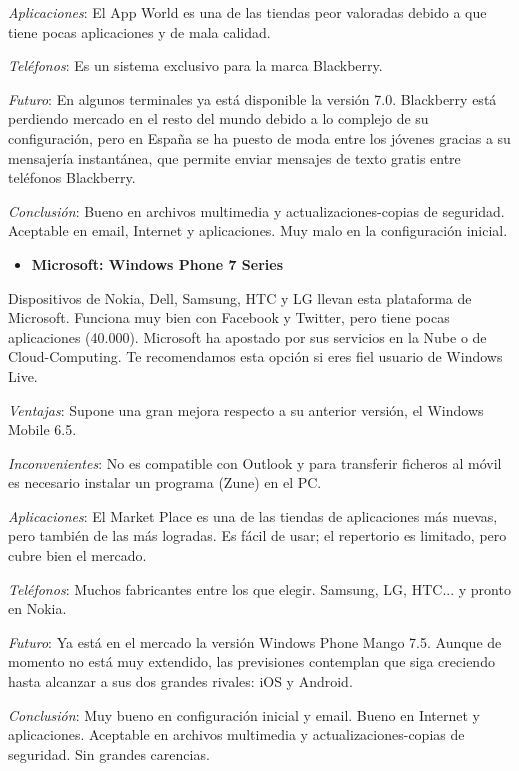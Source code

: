 \documentclass[12 pt, a4paper, twoside]{article}
\begin{document}
\emph{Aplicaciones}: El App World es una de las tiendas peor valoradas
debido a que tiene pocas aplicaciones y de mala calidad.

\emph{Teléfonos}: Es un sistema exclusivo para la marca Blackberry.

\emph{Futuro}: En algunos terminales ya está disponible la versión
7.0. Blackberry está perdiendo mercado en el resto del mundo debido a
lo complejo de su configuración, pero en España se ha puesto de moda
entre los jóvenes gracias a su mensajería instantánea, que permite
enviar mensajes de texto gratis entre teléfonos Blackberry.

\emph{Conclusión}: Bueno en archivos multimedia y actualizaciones-copias de seguridad. Aceptable en email, Internet y aplicaciones. Muy malo en la configuración inicial.


\begin{itemize}
\item \textbf{Microsoft: Windows Phone 7 Series}
\end{itemize}

Dispositivos de Nokia, Dell, Samsung, HTC y LG llevan esta plataforma
de Microsoft. Funciona muy bien con Facebook y Twitter, pero tiene
pocas aplicaciones (40.000). Microsoft ha apostado por sus servicios
en la Nube o de Cloud-Computing. Te recomendamos esta opción si eres
fiel usuario de Windows Live.

\emph{Ventajas}: Supone una gran mejora respecto a su anterior
versión, el Windows Mobile 6.5.

\emph{Inconvenientes}: No es compatible con Outlook y para transferir
ficheros al móvil es necesario instalar un programa (Zune) en el PC.

\emph{Aplicaciones}: El Market Place es una de las tiendas de
aplicaciones más nuevas, pero también de las más logradas. Es fácil de
usar; el repertorio es limitado, pero cubre bien el mercado.

\emph{Teléfonos}: Muchos fabricantes entre los que elegir. Samsung,
LG, HTC... y pronto en Nokia.

\emph{Futuro}: Ya está en el mercado la versión Windows Phone Mango
7.5. Aunque de momento no está muy extendido, las previsiones
contemplan que siga creciendo hasta alcanzar a sus dos grandes
rivales: iOS y Android.

\emph{Conclusión}: Muy bueno en configuración inicial y email. Bueno
en Internet y aplicaciones. Aceptable en archivos multimedia y
actualizaciones-copias de seguridad. Sin grandes carencias.
\end{document}
